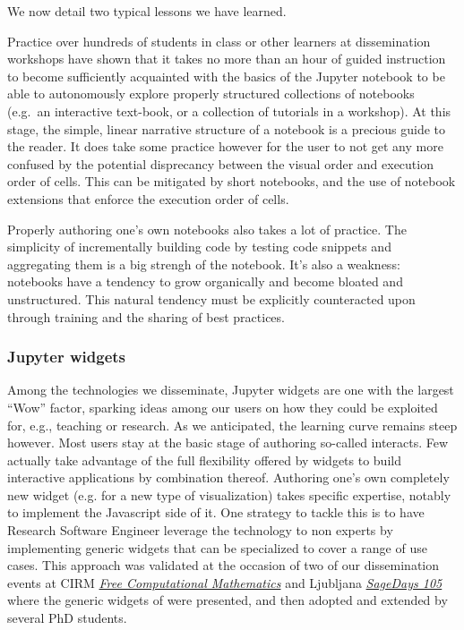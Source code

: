 \documentclass{deliverablereport}
\begin{document}
We now detail two typical lessons we have learned.

Practice over hundreds of students in class or other learners at
dissemination workshops have shown that it takes no more than an hour of
guided instruction to become sufficiently acquainted with the basics of
the Jupyter notebook to be able to autonomously explore properly
structured collections of notebooks (e.g.~an interactive text-book, or a
collection of tutorials in a workshop). At this stage, the simple,
linear narrative structure of a notebook is a precious guide to the
reader.
It does take some practice however for the user to not get any more
confused by the potential disprecancy between the visual order and
execution order of cells. This can be mitigated by short notebooks, and
the use of notebook extensions that enforce the execution order of
cells.

Properly authoring one's own notebooks also takes a lot of practice.
The simplicity of incrementally building code by testing code snippets
and aggregating them is a big strengh of the notebook. It's also a
weakness: notebooks have a tendency to grow organically and become
bloated and unstructured. This natural tendency must be explicitly
counteracted upon through training and the sharing of best practices.

\subsubsection{Jupyter widgets}

Among the technologies we disseminate, Jupyter widgets are one with
the largest ``Wow'' factor, sparking ideas among our users on how they
could be exploited for, e.g., teaching or research. As we anticipated,
the learning curve remains steep however. Most users stay at the basic
stage of authoring so-called interacts. Few actually take advantage of
the full flexibility offered by widgets to build interactive
applications by combination thereof. Authoring one's own completely
new widget (e.g. for a new type of visualization) takes specific
expertise, notably to implement the Javascript side of it. One
strategy to tackle this is to have Research Software Engineer leverage
the technology to non experts by implementing generic widgets that can
be specialized to cover a range of use cases. This approach was
validated at the occasion of two of our dissemination events at CIRM \href{https://conferences.cirm-math.fr/1978.html}{\emph{Free Computational Mathematics}}
and Ljubljana \href{https://wiki.sagemath.org/fpsac19}{\emph{SageDays 105}} where the generic widgets of
 were presented, and then
adopted and extended by several PhD students.
\end{document}
